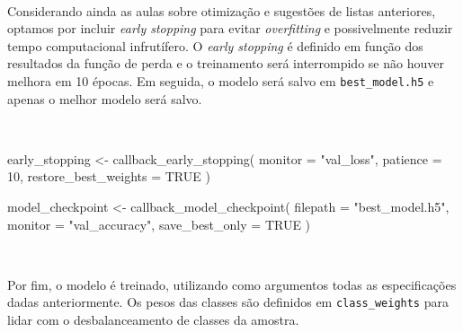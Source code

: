 \documentclass[
  a4paperpaper,
]{article}
\newenvironment{Shaded}{\begin{snugshade}}{\end{snugshade}}
\newcommand{\AttributeTok}[1]{\textcolor[rgb]{0.40,0.45,0.13}{#1}}
\newcommand{\ConstantTok}[1]{\textcolor[rgb]{0.56,0.35,0.01}{#1}}
\newcommand{\DecValTok}[1]{\textcolor[rgb]{0.68,0.00,0.00}{#1}}
\newcommand{\FunctionTok}[1]{\textcolor[rgb]{0.28,0.35,0.67}{#1}}
\newcommand{\NormalTok}[1]{\textcolor[rgb]{0.00,0.23,0.31}{#1}}
\newcommand{\OtherTok}[1]{\textcolor[rgb]{0.00,0.23,0.31}{#1}}
\newcommand{\StringTok}[1]{\textcolor[rgb]{0.13,0.47,0.30}{#1}}
\begin{document}
~

Considerando ainda as aulas sobre otimização e sugestões de listas
anteriores, optamos por incluir \emph{early stopping} para evitar
\emph{overfitting} e possivelmente reduzir tempo computacional
infrutífero. O \emph{early stopping} é definido em função dos resultados
da função de perda e o treinamento será interrompido se não houver
melhora em 10 épocas. Em seguida, o modelo será salvo em
\texttt{best\_model.h5} e apenas o melhor modelo será salvo.

~

\begin{Shaded}
\begin{Highlighting}[]
\NormalTok{early\_stopping }\OtherTok{\textless{}{-}} \FunctionTok{callback\_early\_stopping}\NormalTok{(}
  \AttributeTok{monitor =} \StringTok{"val\_loss"}\NormalTok{,}
  \AttributeTok{patience =} \DecValTok{10}\NormalTok{,}
  \AttributeTok{restore\_best\_weights =} \ConstantTok{TRUE}
\NormalTok{)}

\NormalTok{model\_checkpoint }\OtherTok{\textless{}{-}} \FunctionTok{callback\_model\_checkpoint}\NormalTok{(}
  \AttributeTok{filepath =} \StringTok{"best\_model.h5"}\NormalTok{,}
  \AttributeTok{monitor =} \StringTok{"val\_accuracy"}\NormalTok{,}
  \AttributeTok{save\_best\_only =} \ConstantTok{TRUE}
\NormalTok{)}
\end{Highlighting}
\end{Shaded}

~

Por fim, o modelo é treinado, utilizando como argumentos todas as
especificações dadas anteriormente. Os pesos das classes são definidos
em \texttt{class\_weights} para lidar com o desbalanceamento de classes
da amostra.

~
\end{document}
